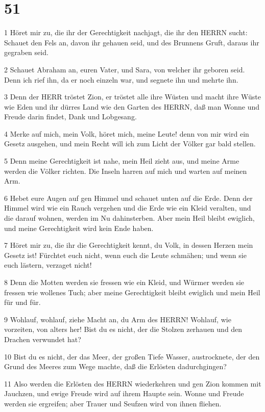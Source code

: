 \chapter{51}

\par 1 Höret mir zu, die ihr der Gerechtigkeit nachjagt, die ihr den HERRN sucht: Schauet den Fels an, davon ihr gehauen seid, und des Brunnens Gruft, daraus ihr gegraben seid.
\par 2 Schauet Abraham an, euren Vater, und Sara, von welcher ihr geboren seid. Denn ich rief ihn, da er noch einzeln war, und segnete ihn und mehrte ihn.
\par 3 Denn der HERR tröstet Zion, er tröstet alle ihre Wüsten und macht ihre Wüste wie Eden und ihr dürres Land wie den Garten des HERRN, daß man Wonne und Freude darin findet, Dank und Lobgesang.
\par 4 Merke auf mich, mein Volk, höret mich, meine Leute! denn von mir wird ein Gesetz ausgehen, und mein Recht will ich zum Licht der Völker gar bald stellen.
\par 5 Denn meine Gerechtigkeit ist nahe, mein Heil zieht aus, und meine Arme werden die Völker richten. Die Inseln harren auf mich und warten auf meinen Arm.
\par 6 Hebet eure Augen auf gen Himmel und schauet unten auf die Erde. Denn der Himmel wird wie ein Rauch vergehen und die Erde wie ein Kleid veralten, und die darauf wohnen, werden im Nu dahinsterben. Aber mein Heil bleibt ewiglich, und meine Gerechtigkeit wird kein Ende haben.
\par 7 Höret mir zu, die ihr die Gerechtigkeit kennt, du Volk, in dessen Herzen mein Gesetz ist! Fürchtet euch nicht, wenn euch die Leute schmähen; und wenn sie euch lästern, verzaget nicht!
\par 8 Denn die Motten werden sie fressen wie ein Kleid, und Würmer werden sie fressen wie wollenes Tuch; aber meine Gerechtigkeit bleibt ewiglich und mein Heil für und für.
\par 9 Wohlauf, wohlauf, ziehe Macht an, du Arm des HERRN! Wohlauf, wie vorzeiten, von alters her! Bist du es nicht, der die Stolzen zerhauen und den Drachen verwundet hat?
\par 10 Bist du es nicht, der das Meer, der großen Tiefe Wasser, austrocknete, der den Grund des Meeres zum Wege machte, daß die Erlösten dadurchgingen?
\par 11 Also werden die Erlösten des HERRN wiederkehren und gen Zion kommen mit Jauchzen, und ewige Freude wird auf ihrem Haupte sein. Wonne und Freude werden sie ergreifen; aber Trauer und Seufzen wird von ihnen fliehen.
